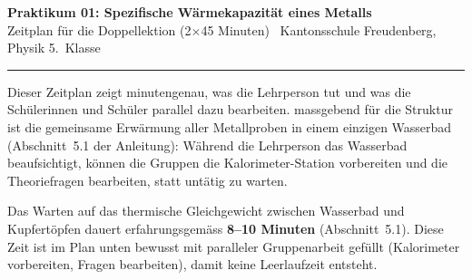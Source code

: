 \documentclass[11pt,a4paper]{article}
\begin{document}
\thispagestyle{empty}

\begin{center}
  {\color{kfrblue}\Large\bfseries Praktikum 01: Spezifische W\"armekapazit\"at eines Metalls}\\[2pt]
  {\normalsize Zeitplan f\"ur die Doppellektion (2$\times$45 Minuten) \textbar\ Kantonsschule Freudenberg, Physik 5.\ Klasse}
\end{center}

\vspace{8pt}
\hrule
\vspace{10pt}

\noindent
Dieser Zeitplan zeigt minutengenau, was die Lehrperson tut und was die Sch\"ulerinnen und Sch\"uler parallel dazu bearbeiten. massgebend f\"ur die Struktur ist die gemeinsame Erw\"armung aller Metallproben in einem einzigen Wasserbad (Abschnitt~5.1 der Anleitung): W\"ahrend die Lehrperson das Wasserbad beaufsichtigt, k\"onnen die Gruppen die Kalorimeter-Station vorbereiten und die Theoriefragen bearbeiten, statt untätig zu warten.

\begin{achtungbox}
Das Warten auf das thermische Gleichgewicht zwischen Wasserbad und Kupfert\"opfen dauert erfahrungsgem\"ass \textbf{8--10 Minuten} (Abschnitt~5.1). Diese Zeit ist im Plan unten bewusst mit paralleler Gruppenarbeit gef\"ullt (Kalorimeter vorbereiten, Fragen bearbeiten), damit keine Leerlaufzeit entsteht.
\end{achtungbox}

\vspace{6pt}

\end{document}
